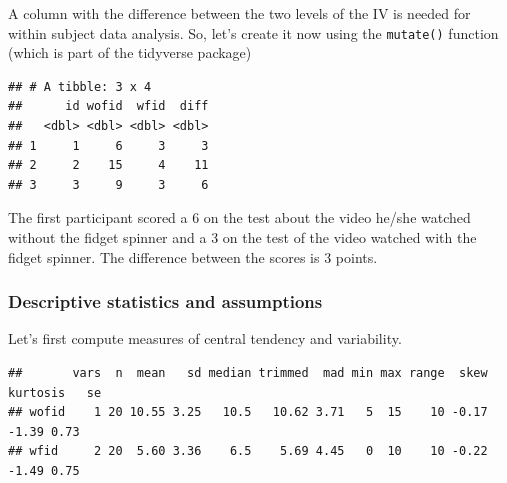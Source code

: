 \documentclass[
]{book}
\newenvironment{Shaded}{\begin{snugshade}}{\end{snugshade}}
\newcommand{\DataTypeTok}[1]{\textcolor[rgb]{0.13,0.29,0.53}{#1}}
\newcommand{\DecValTok}[1]{\textcolor[rgb]{0.00,0.00,0.81}{#1}}
\newcommand{\KeywordTok}[1]{\textcolor[rgb]{0.13,0.29,0.53}{\textbf{#1}}}
\newcommand{\NormalTok}[1]{#1}
\newcommand{\OperatorTok}[1]{\textcolor[rgb]{0.81,0.36,0.00}{\textbf{#1}}}
\newcommand{\StringTok}[1]{\textcolor[rgb]{0.31,0.60,0.02}{#1}}
\begin{document}
A column with the difference between the two levels of the IV is needed for within subject data analysis. So, let's create it now using the \texttt{mutate()} function (which is part of the tidyverse package)

\begin{Shaded}
\end{Shaded}

\begin{verbatim}
## # A tibble: 3 x 4
##      id wofid  wfid  diff
##   <dbl> <dbl> <dbl> <dbl>
## 1     1     6     3     3
## 2     2    15     4    11
## 3     3     9     3     6
\end{verbatim}

The first participant scored a 6 on the test about the video he/she watched without the fidget spinner and a 3 on the test of the video watched with the fidget spinner. The difference between the scores is 3 points.

\hypertarget{descriptive-statistics-and-assumptions}{%
\subsubsection{Descriptive statistics and assumptions}\label{descriptive-statistics-and-assumptions}}

Let's first compute measures of central tendency and variability.

\begin{Shaded}
\end{Shaded}

\begin{verbatim}
##       vars  n  mean   sd median trimmed  mad min max range  skew kurtosis   se
## wofid    1 20 10.55 3.25   10.5   10.62 3.71   5  15    10 -0.17    -1.39 0.73
## wfid     2 20  5.60 3.36    6.5    5.69 4.45   0  10    10 -0.22    -1.49 0.75
\end{verbatim}
\end{document}
